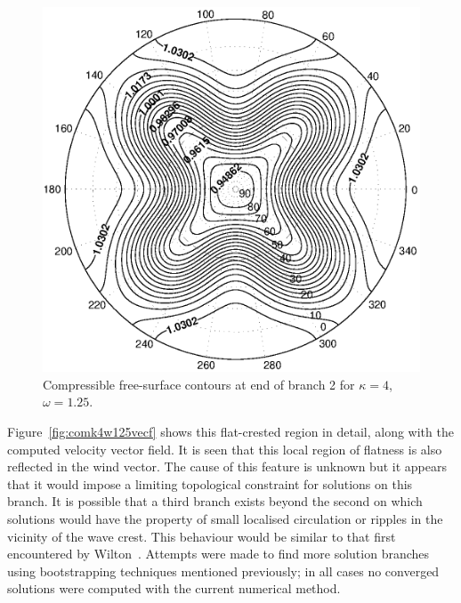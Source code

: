 \begin{figure}[htbp]
	\centering
		\includegraphics[scale=0.75]{IMAGES/compk4w125fsb2.eps}
	\caption{Compressible free-surface contours at end of branch 2 for $\kappa=4$, $\omega=1.25$.}
	\label{fig:compk4w125fsb2}
\end{figure}

Figure~\ref{fig:comk4w125vecf} shows this flat-crested region in detail, along with the computed velocity vector field. It is seen that this local region of flatness is also reflected in the wind vector. The cause of this feature is unknown but it appears that it would impose a limiting topological constraint for solutions on this branch. It is possible that a third branch exists beyond the second on which solutions would have the property of small localised circulation or ripples in the vicinity of the wave crest. This behaviour would be similar to that first encountered by Wilton~\cite{Wilton:OR}. Attempts were made to find more solution branches using bootstrapping techniques mentioned previously; in all cases no converged solutions were computed with the current numerical method.

